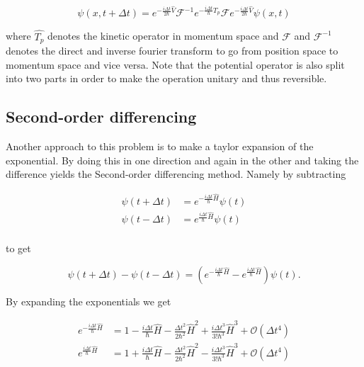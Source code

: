 \begin{equation}
  \label{eq:split}
  \psi(x,t+\Delta t) = e^{-\frac{i\Delta t}{2\hbar}\hat{V}}\mathcal F^{-1} e^{-\frac{i\Delta t}{\hbar}\hat{T_p}}\mathcal F e^{-\frac{i\Delta t}{2\hbar}\hat{V}} \psi(x,t)
\end{equation}

where $\hat{T_p}$ denotes the kinetic operator in momentum space and $\mathcal F$ and $\mathcal F^{-1}$ denotes the direct and inverse fourier transform to go from position space to momentum space and vice versa. Note that the potential operator is also split into two parts in order to make the operation unitary and thus reversible.

\subsection{Second-order differencing}
\label{sec:secondDiff}

Another approach to this problem is to make a taylor expansion of the exponential. By doing this in one direction and again in the other and taking the difference yields the Second-order differencing method. Namely by subtracting

\begin{equation}
  \begin{split}
    \psi(t+\Delta t) &= e^{-\frac{i\Delta t}{\hbar}\hat{H}}\psi(t) \\
    \psi(t-\Delta t) &= e^{\frac{i\Delta t}{\hbar}\hat{H}}\psi(t) \\
  \end{split}
\end{equation}

to get

\begin{equation}
  \psi(t+\Delta t) - \psi(t-\Delta t) = (e^{-\frac{i\Delta t}{\hbar}\hat{H}}-e^{\frac{i\Delta t}{\hbar}\hat{H}})\psi(t).
\end{equation}

By expanding the exponentials we get

\begin{equation}
  \begin{split}
    e^{-\frac{i\Delta t}{\hbar}\hat{H}} &=1 - \frac{i\Delta t}{\hbar}\hat H - \frac{\Delta t^2}{2 \hbar^2}\hat H^2 + \frac{i \Delta t^3}{3! \hbar^3}\hat H^3 + \mathcal O(\Delta t^4) \\
    e^{\frac{i\Delta t}{\hbar}\hat{H}} &=1 + \frac{i\Delta t}{\hbar}\hat H - \frac{\Delta t^2}{2 \hbar^2}\hat H^2 - \frac{i \Delta t^3}{3! \hbar^3}\hat H^3 + \mathcal O(\Delta t^4) \\
  \end{split}
\end{equation}

